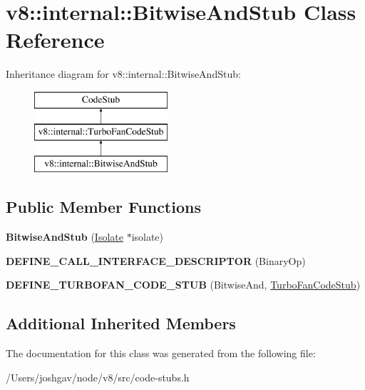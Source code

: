 \hypertarget{classv8_1_1internal_1_1_bitwise_and_stub}{}\section{v8\+:\+:internal\+:\+:Bitwise\+And\+Stub Class Reference}
\label{classv8_1_1internal_1_1_bitwise_and_stub}
Inheritance diagram for v8\+:\+:internal\+:\+:Bitwise\+And\+Stub\+:\begin{figure}[H]
\begin{center}
\leavevmode
\includegraphics[height=3.000000cm]{classv8_1_1internal_1_1_bitwise_and_stub}
\end{center}
\end{figure}
\subsection*{Public Member Functions}
\begin{DoxyCompactItemize}
\item 
{\bfseries Bitwise\+And\+Stub} (\hyperlink{classv8_1_1internal_1_1_isolate}{Isolate} $\ast$isolate)\hypertarget{classv8_1_1internal_1_1_bitwise_and_stub_a09e7848720cf961ea34ef9b9c858677c}{}\label{classv8_1_1internal_1_1_bitwise_and_stub_a09e7848720cf961ea34ef9b9c858677c}

\item 
{\bfseries D\+E\+F\+I\+N\+E\+\_\+\+C\+A\+L\+L\+\_\+\+I\+N\+T\+E\+R\+F\+A\+C\+E\+\_\+\+D\+E\+S\+C\+R\+I\+P\+T\+OR} (Binary\+Op)\hypertarget{classv8_1_1internal_1_1_bitwise_and_stub_a98acb708850e12ad4835f8de8fe5729d}{}\label{classv8_1_1internal_1_1_bitwise_and_stub_a98acb708850e12ad4835f8de8fe5729d}

\item 
{\bfseries D\+E\+F\+I\+N\+E\+\_\+\+T\+U\+R\+B\+O\+F\+A\+N\+\_\+\+C\+O\+D\+E\+\_\+\+S\+T\+UB} (Bitwise\+And, \hyperlink{classv8_1_1internal_1_1_turbo_fan_code_stub}{Turbo\+Fan\+Code\+Stub})\hypertarget{classv8_1_1internal_1_1_bitwise_and_stub_a8772ef864828a9e3bcdbc9bb3f0a8fd2}{}\label{classv8_1_1internal_1_1_bitwise_and_stub_a8772ef864828a9e3bcdbc9bb3f0a8fd2}

\end{DoxyCompactItemize}
\subsection*{Additional Inherited Members}


The documentation for this class was generated from the following file\+:\begin{DoxyCompactItemize}
\item 
/\+Users/joshgav/node/v8/src/code-\/stubs.\+h\end{DoxyCompactItemize}
